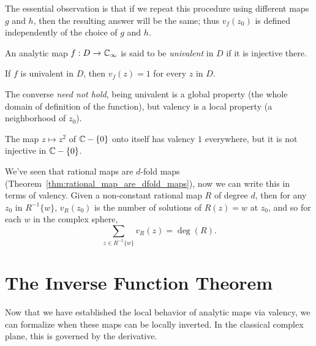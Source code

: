 The essential observation is that if we repeat this procedure using different
maps $g$ and $h$, then the resulting answer will be the same; thus $v_f(z_0)$ is
defined independently of the choice of $g$ and $h$.

\begin{definition}
    An analytic map $f : D \to \mathbb{C}_\infty$ is said to be \emph{univalent} in $D$ if
    it is injective there.
\end{definition}

\begin{remark}[$f$ univalent $\implies v_f(z) = 1 \forall z \in D$]
    If $f$ is univalent in $D$, then $v_f(z) = 1$ for every $z$ in $D$.
\end{remark}

The converse \emph{need not hold}, being univalent is a global property (the
whole domain of definition of the function), but valency is a local property (a
neighborhood of $z_0$).

\begin{example}
    The map $z \mapsto z^2$ of $\mathbb{C} - \{0\}$ onto itself has valency $1$
    everywhere, but it is not injective in $\mathbb{C} - \{0\}$.
\end{example}

\begin{remark}
    We've seen that rational maps are $d$-fold maps
    (Theorem~\ref{thm:rational_map_are_dfold_maps}), now we can write this in
    terms of valency. Given a non-constant rational map $R$ of degree $d$, then
    for any $z_0$ in $R^{-1}\{w\}$, $v_R(z_0)$ is the number of solutions of
    $R(z) = w$ at $z_0$, and so for each $w$ in the complex sphere,
    \begin{equation*}
        \sum_{z \in R^{-1}\{w\}} v_R(z) = \deg(R).
    \end{equation*}
\end{remark}

\section{The Inverse Function Theorem}
\label{sec:the_inverse_function_theorem}

Now that we have established the local behavior of analytic maps via valency, we
can formalize when these maps can be locally inverted. In the classical complex
plane, this is governed by the derivative.

